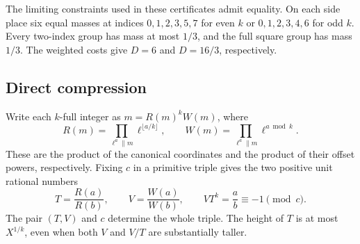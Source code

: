 \documentclass[11pt,reqno]{amsart}
\begin{document}
The limiting constraints used in these certificates admit
equality. On each side place six equal masses at indices
\(0,1,2,3,5,7\) for even \(k\) or \(0,1,2,3,4,6\) for odd \(k\).
Every two-index group has mass at most \(1/3\), and the full
square group has mass \(1/3\). The weighted costs give \(D=6\)
and \(D=16/3\), respectively.

\subsection{Direct compression}\label{sec:direct-compression}

Write each \(k\)-full integer as \(m=R(m)^k W(m)\), where
\[
 R(m)=\prod_{\ell^a\parallel m}\ell^{\lfloor a/k\rfloor},
 \qquad
 W(m)=\prod_{\ell^a\parallel m}\ell^{a\bmod k}.
\]
These are the product of the canonical coordinates and the product
of their offset powers, respectively. Fixing \(c\) in a primitive
triple gives the two positive unit rational numbers
\[
                 T=\frac{R(a)}{R(b)},\qquad V=\frac{W(a)}{W(b)},
                 \qquad VT^k=\frac ab\equiv-1\pmod c .
\]
The pair \((T,V)\) and \(c\) determine the whole triple.
The height of \(T\) is at most \(X^{1/k}\), even when both
\(V\) and \(V/T\) are substantially taller.
\end{document}
